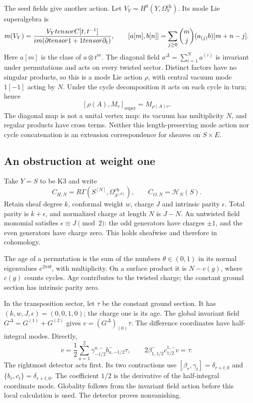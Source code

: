 The seed fields give another action.  Let
\(V_Y=H^0(Y,\Omega_Y^{\mathrm{ch}})\).  Its mode Lie superalgebra is
\[
 m(V_Y)=
 \frac{V_YtensorC[t,t^{-1}]}
 {im(\partial tensor1+1tensor\partial_t)},
 \qquad
 [a[m],b[n]]=\sum_{j\ge0}\binom mj(a_{(j)}b)[m+n-j].
\]
Here \(a[m]\) is the class of \(a\otimes t^m\).
The diagonal field \(a^\Delta=\sum_{i=1}^N a^{(i)}\) is invariant
under permutations and acts on every twisted sector.  Distinct
factors have no singular products, so this is a mode Lie action
\(\rho\), with central vacuum mode \(1[-1]\) acting by \(N\).  Under the
cycle decomposition it acts on each cycle in turn; hence
\[
 [\rho(A),M_v]_{\mathrm{super}}=M_{\rho(A)v}.
\]
The diagonal map is not a unital vertex map: its vacuum has
multiplicity \(N\), and regular products have cross terms.
Neither this length-preserving mode action nor cycle
concatenation is an extension correspondence for sheaves on
\(S\times E\).

\subsection{An obstruction at weight one}

Take \(Y=S\) to be K3 and write
\[
 C_{H,N}=R\Gamma(S^{[N]},\Omega_{S^{[N]}}^{\mathrm{ch}}),
 \qquad C_{O,N}=\mathcal H_N(S).
\]
Retain sheaf degree \(k\), conformal weight \(w\), charge \(J\)
and intrinsic parity \(\epsilon\).  Total parity is
\(k+\epsilon\), and normalized charge at length \(N\) is
\(J-N\).  An untwisted field monomial satisfies
\(\epsilon\equiv J\pmod2\): the odd generators have charges
\(\pm1\), and the even generators have charge zero.
This holds sheafwise and therefore in cohomology.

The age of a permutation is the sum of the numbers
\(\theta\in(0,1)\) in its normal eigenvalues \(e^{2\pi i\theta}\),
with multiplicity.  On a surface product it is \(N-c(g)\), where
\(c(g)\) counts cycles.  Age contributes to the twisted charge;
the constant ground section has intrinsic parity zero.

In the transposition sector, let \(\tau\) be the constant ground
section.  It has \((k,w,J,\epsilon)=(0,0,1,0)\); the charge one
is its age.  The global invariant field
\(G^\Delta=G^{(1)}+G^{(2)}\) gives
\(v=(G^\Delta)_{(0)}\tau\).  The difference coordinates have
half-integral modes.  Directly,
\[
 v=\frac12\sum_{a=1}^2
      \gamma^{a,-}_{-1/2}b^-_{a,-1/2}\tau,
 \qquad
 2\beta^-_{1,1/2}c^{1,-}_{1/2}v=\tau.
\]
The rightmost detector acts first.  Its two contractions use
\([\beta_r,\gamma_t]=\delta_{r+t,0}\) and
\(\{b_r,c_t\}=\delta_{r+t,0}\).  The coefficient \(1/2\)
is the derivative of the half-integral coordinate mode.
Globality follows from the invariant field action before this
local calculation is used.  The detector proves nonvanishing.

